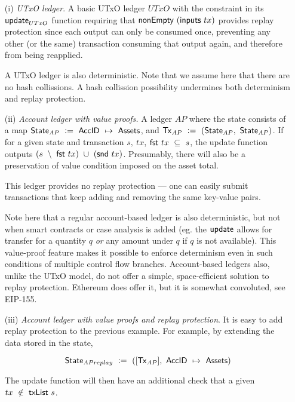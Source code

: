 \begin{itemize}
  \item[(i)] \emph{UTxO ledger}. A basic UTxO ledger $UTxO$ with the constraint in its $\mathsf{update}_{UTxO}$ function
  requiring that $\mathsf{nonEmpty}~(\mathsf{inputs}~tx)$ provides replay protection since
  each output can only be consumed once, preventing any other (or the same) transaction consuming that
  output again, and therefore from being reapplied.

  A UTxO ledger is also deterministic. Note that we assume here that there are no hash collissions.
  A hash collission possibility undermines both determinism and replay protection.\\

  \item[(ii)] \emph{Account ledger with value proofs.} A ledger $AP$ where the state consists of a
  map $\mathsf{State}_{AP}~\mathrel{\mathop:}=~\mathsf{AccID}~\mapsto~\mathsf{Assets}$, and $\mathsf{Tx}_{AP}~\mathrel{\mathop:}=~(\mathsf{State}_{AP},~\mathsf{State}_{AP})$.
  If for a given state and transaction $s,~tx$, $\mathsf{fst}~tx~\subseteq~s$, the
  update function outputs $(s~\setminus~\mathsf{fst}~tx)~\cup~(\mathsf{snd}~tx)$. Presumably,
  there will also be a preservation of value condition imposed on the asset total.

  This ledger provides no replay protection --- one can easily submit transactions
  that keep adding and removing the same key-value pairs.

  Note here that a regular account-based ledger is also deterministic, but not when
  smart contracts or case analysis is added (eg. the $\mathsf{update}$ allows for transfer
  for a quantity $q$ \emph{or} any amount under $q$ if $q$ is not available). This
  value-proof feature makes it possible to enforce determinism even in such
  conditions of multiple control flow branches. Account-based ledgers also, unlike
  the UTxO model, do not offer a simple, space-efficient solution to replay protection.
  Ethereum does offer it, but it is somewhat convoluted, see EIP-155. \\

  \item[(iii)] \emph{Account ledger with value proofs and replay protection}. It is easy to add
  replay protection to the previous example. For example, by extending the data
  stored in the state,

  \[ \mathsf{State}_{APreplay}~\mathrel{\mathop:}=~([\mathsf{Tx}_{AP}],~\mathsf{AccID}~\mapsto~\mathsf{Assets}) \]

  The update function will then have an additional check that a given $tx~\notin~\mathsf{txList}~s$. \\


\end{itemize}

